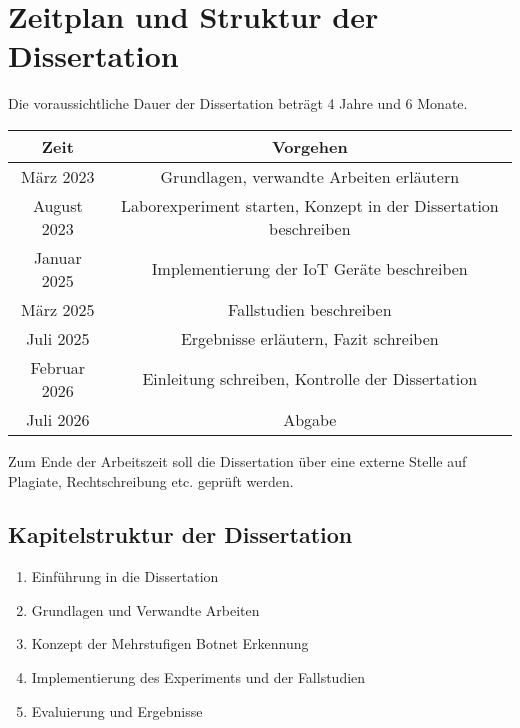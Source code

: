 \section{Zeitplan und Struktur der Dissertation}
\label{sec:plan}

Die voraussichtliche Dauer der Dissertation beträgt 4 Jahre und 6 Monate.

\begin{center}
    \begin{tabular}[c]{| c | c |}
        \hline
        \rowcolor{lightgray} Zeit & Vorgehen \\ [0.5ex]
        \hline
        März 2023 & Grundlagen, verwandte Arbeiten erläutern \\
        \hline
        August 2023 &  Laborexperiment starten, Konzept in der Dissertation beschreiben \\
        \hline
        Januar 2025 & Implementierung der IoT Geräte beschreiben \\
        \hline
        März 2025 & Fallstudien beschreiben \\
        \hline
        Juli 2025 & Ergebnisse erläutern, Fazit schreiben \\
        \hline
        Februar 2026 & Einleitung schreiben, Kontrolle der Dissertation \\
        \hline
        Juli 2026 & Abgabe \\
        \hline
    \end{tabular}
\end{center}

Zum Ende der Arbeitszeit soll die Dissertation über eine externe Stelle auf Plagiate, Rechtschreibung etc.
geprüft werden.

\subsection*{Kapitelstruktur der Dissertation}

\begin{enumerate}[label=\Roman*]
    \item Einführung in die Dissertation
    \item Grundlagen und Verwandte Arbeiten
    \item Konzept der Mehrstufigen Botnet Erkennung
    \item Implementierung des Experiments und der Fallstudien
    \item Evaluierung und Ergebnisse
\end{enumerate}